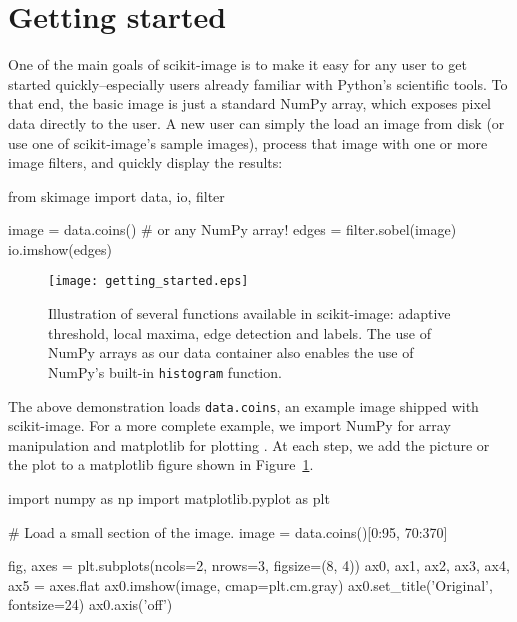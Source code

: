 
\section*{Getting started}
  \label{sec:getting-started}

  One of the main goals of scikit-image is to make it easy for any user to get started quickly--especially users already familiar with Python's scientific tools. To that end, the basic image is just a standard NumPy array, which exposes pixel data directly to the user. A new user can simply the load an image from disk (or use one of scikit-image's sample images), process that image with one or more image filters, and quickly display the results:

  \begin{pyverbatim}
    from skimage import data, io, filter

    image = data.coins()  # or any NumPy array!
    edges = filter.sobel(image)
    io.imshow(edges)
  \end{pyverbatim}

  \begin{figure}
    \texttt{[image: getting\_started.eps]}

    \caption[Getting started figure]{\label{fig:gettingstarted}Illustration of several functions available in scikit-image: adaptive threshold, local maxima, edge detection and labels. The use of NumPy arrays as our data container also enables the use of NumPy's built-in \texttt{histogram} function.}
  \end{figure}

  The above demonstration loads \texttt{data.coins}, an example image shipped with scikit-image.  For a more complete example, we import NumPy for array manipulation and matplotlib for plotting \citep{numpy,matplotlib}.  At each step, we add the picture or the plot to a matplotlib figure shown in Figure~\ref{fig:gettingstarted}.

  \begin{pyverbatim}
    import numpy as np
    import matplotlib.pyplot as plt

    # Load a small section of the image.
    image = data.coins()[0:95, 70:370]

    fig, axes = plt.subplots(ncols=2, nrows=3,
                             figsize=(8, 4))
    ax0, ax1, ax2, ax3, ax4, ax5  = axes.flat
    ax0.imshow(image, cmap=plt.cm.gray)
    ax0.set_title('Original', fontsize=24)
    ax0.axis('off')
  \end{pyverbatim}

